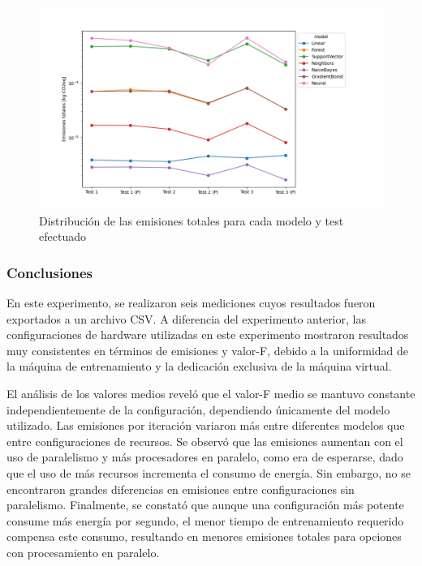 \begin{figure}[H]
  \centerline{
     \includegraphics[width=1.2\textwidth, keepaspectratio]{img/graph/4-2-line-total-emissions.png}
  }
  \caption{Distribución de las emisiones totales para cada modelo y test efectuado}
  \label{fig:4-2-line-total-emissions}
\end{figure}

\subsubsection{Conclusiones}

En este experimento, se realizaron seis mediciones cuyos resultados fueron exportados a un archivo CSV. A diferencia del experimento anterior, las configuraciones de hardware utilizadas en este experimento mostraron resultados muy consistentes en términos de emisiones y valor-F, debido a la uniformidad de la máquina de entrenamiento y la dedicación exclusiva de la máquina virtual.

El análisis de los valores medios reveló que el valor-F medio se mantuvo constante independientemente de la configuración, dependiendo únicamente del modelo utilizado. Las emisiones por iteración variaron más entre diferentes modelos que entre configuraciones de recursos. Se observó que las emisiones aumentan con el uso de paralelismo y más procesadores en paralelo, como era de esperarse, dado que el uso de más recursos incrementa el consumo de energía. Sin embargo, no se encontraron grandes diferencias en emisiones entre configuraciones sin paralelismo. Finalmente, se constató que aunque una configuración más potente consume más energía por segundo, el menor tiempo de entrenamiento requerido compensa este consumo, resultando en menores emisiones totales para opciones con procesamiento en paralelo.

\clearpage